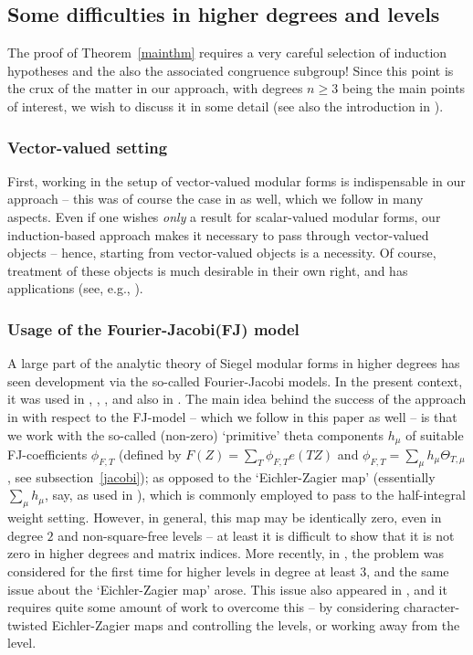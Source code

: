 \documentclass[11pt]{amsart}
\numberwithin{equation}{section}
\newcommand{\sumn}{\sum \nolimits}
\begin{document}
\subsection{Some difficulties in higher degrees and levels}
The proof of Theorem~\ref{mainthm} requires a very careful selection of induction hypotheses and the also the associated congruence subgroup! Since this point is the crux of the matter in our approach, with degrees $n \ge 3$ being the main points of interest, we wish to discuss it in some detail (see also the introduction in \cite{washburn2025certain}). 
\subsubsection{Vector-valued setting} \label{vec-smf}
First, working in the setup of vector-valued modular forms is indispensable in our approach -- this was of course the case in \cite{boche-das} as well, which we follow in many aspects. Even if one wishes \textit{only} a result for scalar-valued modular forms, our induction-based approach makes it necessary to pass through vector-valued objects -- hence, starting from vector-valued objects is a necessity. Of course, treatment of these objects is much desirable in their own right, and has applications (see, e.g., \cite{marzec2018non}).

\subsubsection{Usage of the Fourier-Jacobi(FJ) model}
A large part of the analytic theory of Siegel modular forms in higher degrees has seen development via the so-called Fourier-Jacobi models. In the present context, it was used in  \cite{yamana2009determination},  \cite{saha2012determination}, \cite{saha2013siegel}, \cite{anamby2019distinguishing} and also in \cite{boche-das}. The main idea behind the success of the approach in \cite{boche-das} with respect to the FJ-model -- which we follow in this paper as well -- is that we work with the so-called (non-zero) `primitive' theta components $h_\mu$ of suitable FJ-coefficients $\phi_{F,T}$ (defined by $\displaystyle F(Z)=\sumn_T \phi_{F,T}e(TZ)$ and $\phi_{F,T}=\sumn_\mu h_\mu \Theta_{T,\mu}$, see subsection~\eqref{jacobi}); as opposed to the `Eichler-Zagier map' (essentially $\sumn_\mu h_\mu$, say, as used in \cite{saha2013yoshida}), which is commonly employed to pass to the half-integral weight setting. However, in general, this map may be identically zero, even in degree $2$ and non-square-free levels -- at least it is difficult to show that it is not zero in higher degrees and matrix indices. More recently, in \cite{washburn2025certain}, the problem was considered for the first time for higher levels in degree at least $3$,  and the same issue about the `Eichler-Zagier map' arose. This issue also appeared in \cite{anamby2019distinguishing}, and it requires quite some amount of work to overcome this -- by considering character-twisted Eichler-Zagier maps and controlling the levels, or working away from the level.
\end{document}
